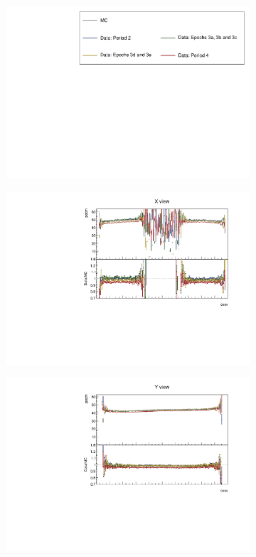 \documentclass[12pt,a4paper]{article}
\begin{document}
\begin{figure}[!ht]
  \begin{subfigure}{\textwidth}
  \centering
    \includegraphics[height=0.2\linewidth]{essentialsec_tb/legend.pdf}
  \end{subfigure}
  \vspace*{2mm}

  \begin{subfigure}{0.5\textwidth}
    \includegraphics[width=\linewidth]{PlotsAngularDistribution/pecm_cosx_x.pdf}
  \end{subfigure}
  \begin{subfigure}{0.5\textwidth}
    \includegraphics[width=\linewidth]{PlotsAngularDistribution/pecm_cosx_y.pdf}

\end{subfigure}
\end{figure}
\end{document}
